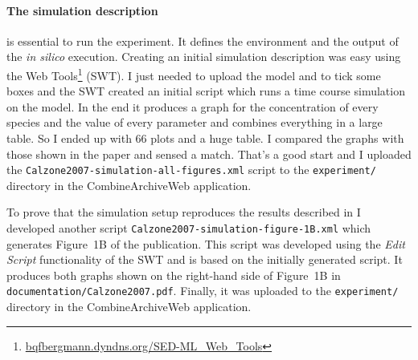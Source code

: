 \paragraph{The simulation description} is essential to run the experiment.
It defines the environment and the output of the \textit{in silico} execution.
Creating an initial simulation description was easy using the \sedml Web Tools\footnote{\href{http://bqfbergmann.dyndns.org/SED-ML_Web_Tools}{bqfbergmann.dyndns.org/SED-ML\_Web\_Tools}} (SWT).
I just needed to upload the model and to tick some boxes and the SWT created an initial \sedml script which runs a time course simulation on the model.
In the end it produces a graph for the concentration of every species and the value of every parameter and combines everything in a large table.
So I ended up with 66 plots and a huge table.
I compared the graphs with those shown in the paper and sensed a match.
That's a good start and I uploaded the \sedml \texttt{Calzone2007-simulation-all-figures.xml} script to the \texttt{experiment/} directory in the CombineArchiveWeb application.

To prove that the simulation setup reproduces the results described in \cite{Calzone2007} I developed another \sedml script \texttt{Calzone2007-simulation-figure-1B.xml} which generates Figure~1B of the publication.
This script was developed using the \textit{Edit Script} functionality of the SWT and is based on the initially generated script.
It produces both graphs shown on the right-hand side of Figure~1B in \texttt{documentation/Calzone2007.pdf}.
Finally, it was uploaded to the \texttt{experiment/} directory in the CombineArchiveWeb application.




